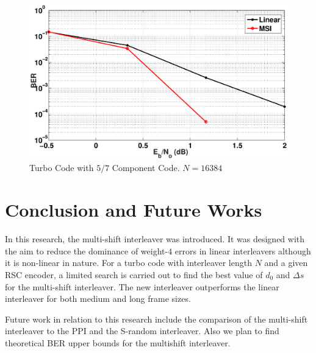 \documentclass[a4paper, 12pt, oneside, openary]{jbook}
\begin{document}
		\begin{figure}[h!]
\centering
		\includegraphics[width =\textwidth]{msi_linear_16384.eps}
		\caption{Turbo Code with $5/7$ Component Code. $N=16384$}
		\label{res3}
		\end{figure}


\chapter{Conclusion and Future Works}

In this research, the multi-shift interleaver was introduced. It was designed with the aim
to reduce the dominance of weight-$4 $ errors in linear interleavers although it is non-linear in nature. For a turbo code
with interleaver length $N$ and a given RSC encoder, a limited search is carried out to 
find the best value of $d_0$ and $\Delta s$ for the multi-shift interleaver. The new 
interleaver outperforms the linear interleaver for both medium and long frame sizes. 

Future work in relation to this research include the comparison of the multi-shift interleaver to the PPI and the S-random interleaver. Also we plan to find theoretical BER upper bounds for the multishift interleaver.
\end{document}
